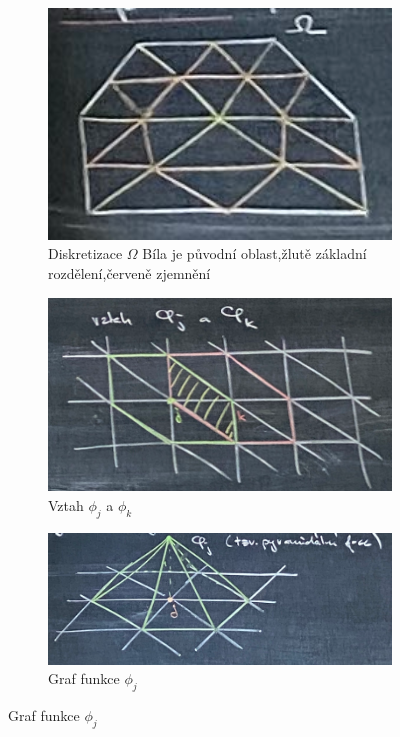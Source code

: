 \documentclass[../main.tex]{subfiles}
\begin{document}
\begin{figure}
    \centering
    \begin{subfigure}[bt]{0.3\textwidth}
        \centering
        \includegraphics[width=1\textwidth]{images/diskretizace.png}
        \caption{Diskretizace $\Omega$ \hfill\break Bíla je původní oblast,\hfill\break žlutě základní rozdělení,\hfill\break červeně zjemnění \hfill}
    \end{subfigure}
    \hfill
    \begin{subfigure}[t]{0.3\textwidth}
        \centering
        \includegraphics[width=1\textwidth]{images/vztahphi.png}
        \caption{Vztah $\phi_j$ a $\phi_k$}
    \end{subfigure}
    \hfill
    \begin{subfigure}[t]{0.3\textwidth}
        \centering
        \includegraphics[width=1\textwidth]{images/grafphi.png}
        \caption{Graf funkce $\phi_j$}
    \end{subfigure}
\end{figure}
\end{document}
